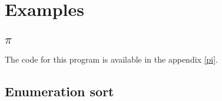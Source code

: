 \chapter{Examples}

\section{$\pi$}

The code for this program is available in the appendix \ref{pi}.

\section{Enumeration sort} 
